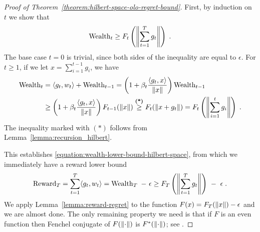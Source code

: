 \begin{proof}[Proof of Theorem~\ref{theorem:hilbert-space-olo-regret-bound}]
First, by induction on $t$ we show that
\begin{equation}
\label{equation:wealth-lower-bound-hilbert-space}
\operatorname{Wealth}_t \ge F_t\left(\left\|{\sum_{t=1}^T g_t}\right\| \right) \; .
\end{equation}
The base case $t=0$ is trivial, since both sides of the inequality are equal to
$\epsilon$.  For $t \ge 1$, if we let $x = \sum_{i=1}^{t-1} g_i$, we have
\begin{align*}
\operatorname{Wealth}_t
&= \langle g_t, w_t \rangle + \operatorname{Wealth}_{t-1}
= \left(1 + \beta_t \frac{\langle g_t, x \rangle}{\left\|{x}\right\|} \right) \operatorname{Wealth}_{t-1} \\
&\ge \left(1 + \beta_t \frac{\langle g_t, x \rangle}{\left\|{x}\right\|} \right) F_{t-1}(\left\|{x}\right\|)
\stackrel{\text{\textbf{(*)}}}{\ge} F_t(\left\|{x + g_t}\right\|)
= F_t\left(\left\|{\sum_{i=1}^t g_i}\right\| \right) \; .
\end{align*}
The inequality marked with $(*)$ follows from
Lemma~\ref{lemma:recursion_hilbert}.

This establishes \eqref{equation:wealth-lower-bound-hilbert-space},
from which we immediately have a reward lower bound
\begin{equation}
\label{equation:hilbert-space-olo-reward-lower-bound}
\operatorname{Reward}_T
= \sum_{t=1}^T \langle g_t, w_t \rangle
= \operatorname{Wealth}_T \ - \ \epsilon
\ge F_T\left(\left\|{\sum_{t=1}^T g_t}\right\| \right) \ - \ \epsilon \; .
\end{equation}
We apply Lemma~\ref{lemma:reward-regret} to the function $F(x) = F_T(\left\|{x}\right\|) -
\epsilon$ and we are almost done. The only remaining property we need is that if
$F$ is an even function then Fenchel conjugate of $F(\left\|{\cdot}\right\|)$ is
$F^*(\left\|{\cdot}\right\|)$; see \citet[Example 13.7]{Bauschke-Combettes-2011}.
\end{proof}
